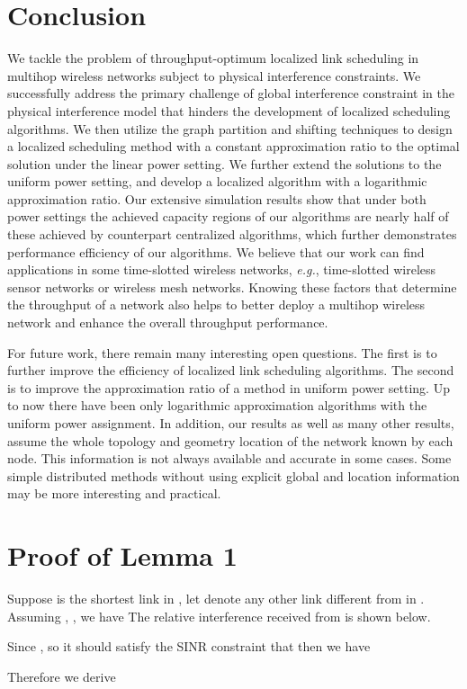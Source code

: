 \documentclass[journal]{IEEEtran}
\begin{document}
\section{Conclusion}
We tackle  the problem of throughput-optimum localized link scheduling in multihop wireless networks subject to physical interference constraints.
We successfully address the primary challenge of global interference constraint in the physical interference model that hinders the development of localized scheduling algorithms. We then utilize the graph partition and shifting techniques to design a localized scheduling method with a constant approximation ratio to the optimal solution under the linear power setting. We further extend the solutions to the uniform power setting, and develop a localized algorithm with a logarithmic approximation ratio. Our extensive simulation results show that under both power settings the achieved capacity regions of our algorithms are nearly half of these achieved by counterpart centralized algorithms, which further demonstrates performance efficiency of our algorithms.  We believe that our work can find applications in some time-slotted wireless networks, \emph{e.g.}, time-slotted wireless sensor networks or wireless mesh networks. Knowing these factors that determine the throughput of a network also helps to better deploy a multihop wireless network and enhance the overall throughput performance.

For future work, there remain many interesting open questions.
The first is to further improve the efficiency of localized link scheduling algorithms. The second is to improve the approximation ratio of a method in uniform power setting. Up to now there have been only logarithmic approximation algorithms with the uniform power assignment. In addition, our results as well as many other results, assume the whole topology and geometry location of the network known by each node. This information is not always available and accurate in some cases. Some simple distributed methods without using explicit global and location information may be more interesting and practical.








\appendices
\section{Proof of Lemma 1}
\begin{IEEEproof}
Suppose  is the shortest link in ,
let  denote any other link different from  in .
Assuming , , we have
{\small{}}
The relative interference  received from  is
shown below.




Since , so it should satisfy the SINR constraint that {\small{}}
then we have

Therefore we derive


\end{IEEEproof}
\end{document}
